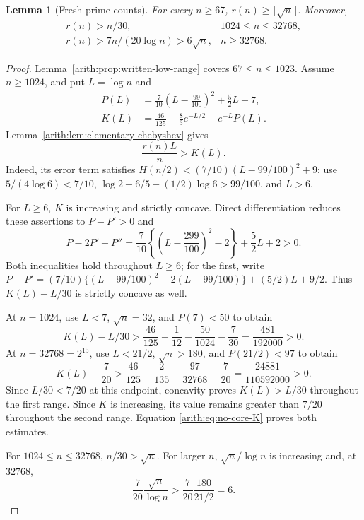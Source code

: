 \documentclass[11pt]{article}
\numberwithin{equation}{section}
\newtheorem{lemma}[theorem]{Lemma}
\theoremstyle{definition}\newtheorem{definition}[theorem]{Definition}
\theoremstyle{remark}\newtheorem{remark}[theorem]{Remark}
\begin{document}
\begin{lemma}[Fresh prime counts]\label{arith:lem:no-core-fresh-budget}
For every $n\ge67$, $r(n)\ge\lfloor\sqrt n\rfloor$. Moreover,
\[
 \begin{array}{ll}
 r(n)>n/30,&1024\le n\le32768,\\[2pt]
 r(n)>7n/(20\log n)>6\sqrt n,&n\ge32768.
 \end{array}
\]
\end{lemma}
\begin{proof}
Lemma~\ref{arith:prop:written-low-range} covers $67\le n\le1023$.
Assume $n\ge1024$, and put $L=\log n$ and
\[
 \begin{aligned}
 P(L)&=\frac7{10}\left(L-\frac{99}{100}\right)^2+\frac52L+7,\\
 K(L)&=\frac{46}{125}-\frac83e^{-L/2}-e^{-L}P(L).
 \end{aligned}
\]
Lemma~\ref{arith:lem:elementary-chebyshev} gives
\begin{equation}\label{arith:eq:no-core-K}
                         \frac{r(n)L}{n}>K(L).
\end{equation}
Indeed, its error term satisfies
$H(n/2)<(7/10)(L-99/100)^2+9$: use
$5/(4\log6)<7/10$,
$\log2+6/5-(1/2)\log6>99/100$, and $L>6$.

For $L\ge6$, $K$ is increasing and strictly concave.  Direct
differentiation reduces these assertions to $P-P'>0$ and
\[
 P-2P'+P''
 =\frac7{10}\left\{\left(L-\frac{299}{100}\right)^2-2\right\}
       +\frac52L+2>0.
\]
Both inequalities hold throughout $L\ge6$; for the first, write
$P-P'=(7/10)\{(L-99/100)^2-2(L-99/100)\}+(5/2)L+9/2$.
Thus $K(L)-L/30$ is strictly concave as well.

At $n=1024$, use $L<7$, $\sqrt n=32$, and $P(7)<50$ to obtain
\[
 K(L)-L/30>
 \frac{46}{125}-\frac1{12}-\frac{50}{1024}-\frac7{30}
 =\frac{481}{192000}>0.
\]
At $n=32768=2^{15}$, use $L<21/2$, $\sqrt n>180$, and
$P(21/2)<97$ to obtain
\[
 K(L)-\frac7{20}>
 \frac{46}{125}-\frac2{135}-\frac{97}{32768}-\frac7{20}
 =\frac{24881}{110592000}>0.
\]
Since $L/30<7/20$ at this endpoint, concavity proves $K(L)>L/30$
throughout the first range.  Since $K$ is increasing, its value remains
greater than $7/20$ throughout the second range.  Equation
\eqref{arith:eq:no-core-K} proves both estimates.

For $1024\le n\le32768$, $n/30>\sqrt n$. For larger $n$,
$\sqrt n/\log n$ is increasing and, at $32768$,
\[
 \frac7{20}\frac{\sqrt n}{\log n}
       >\frac7{20}\frac{180}{21/2}=6.
\]
\end{proof}
\end{document}
